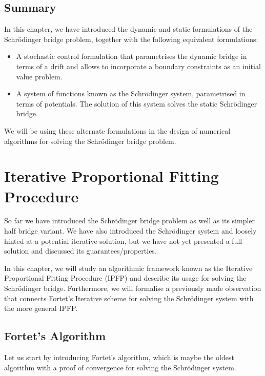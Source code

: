 \documentclass[a4paper,12pt,twoside,openright]{report}
\theoremstyle{definition}
\begin{document}
\section{Summary}
 In this chapter, we have introduced the dynamic and static formulations of the Schrödinger bridge problem, together with the following equivalent formulations:
 \begin{itemize}
     \item A stochastic control formulation that parametrises the dynamic bridge in terms of a drift and allows to incorporate a boundary constraints as an initial value problem.
     \item A system of functions known as the Schrödinger system, parametrised in terms of potentials. The solution of this system solves the static Schrödinger bridge. 
 \end{itemize}
 We will be using these alternate formulations in the design of numerical algorithms for solving the Schrödinger bridge problem.
\chapter{Iterative Proportional Fitting Procedure}

So far we have introduced the Schrödinger bridge problem as well as its simpler half bridge variant. We have also introduced the Schrödinger system and loosely hinted at a potential iterative solution, but we have not yet presented a full solution and discussed its guarantees/properties.

In this chapter, we will study an algorithmic framework known as the Iterative Proportional Fitting Procedure (IPFP) \citep{csiszar1975divergence, kullback1968probability, ruschendorf1995convergence,cramer2000probability} and describe its usage for solving the Schrödinger bridge. Furthermore, we will formalise a previously made observation that connects Fortet's Iterative scheme \citep{fortet1940resolution} for solving the Schrödinger system with the more general IPFP. 

\section{Fortet's Algorithm}

Let us start by introducing Fortet's algorithm, which is maybe the oldest algorithm with a proof of convergence \citep{fortet1940resolution} for solving the Schrödinger system.
\end{document}
